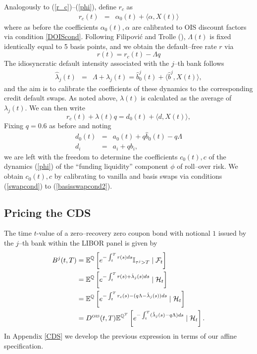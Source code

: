 \documentclass[12pt,a4paper]{article}
\theoremstyle{plain}
\numberwithin{equation}{section}
\begin{document}
Analogously to (\ref{r_c})--(\ref{phi}), define $r_c$ as
\begin{eqnarray}
r_c(t)    &=& \alpha_0(t)+\langle \alpha , X(t) \rangle\label{r}
\end{eqnarray}
where as before the coefficients $\alpha_0(t), \alpha$ are calibrated to OIS discount factors via condition \ref{DOIScond}. Following Filipovi\'c and Trolle (\citeyear*{FilTro:2013}), $\Lambda(t)$ is fixed identically equal to 5 basis points, and we obtain the default--free rate $r$ via
\begin{equation}
r(t)=r_c(t)-\Lambda q
\end{equation}
The idiosyncratic default intensity associated with the $j$--th bank follows
\begin{eqnarray}
\hat{\lambda}_j(t) &=&\Lambda+ \lambda_j(t) =\hat{b}_0^j(t)+\langle \hat{b}^j , X(t) \rangle,\label{lambdaj} \end{eqnarray}
and the aim is to calibrate the coefficients of these dynamics to the corresponding credit default swaps. As noted above, $\lambda(t)$ is calculated as the average of $ \lambda_j(t)$. We can then write
$$r_c(t)+\lambda(t)q=d_0(t)+\langle d, X(t) \rangle,$$
Fixing $q=0.6$ as before and noting
\begin{eqnarray}
d_0(t) &=& a_0(t)+q\hat b_0(t)-q\Lambda\\
d_i &=& a_i+qb_i,
\end{eqnarray}
we are left with the freedom to determine the coefficients $c_0(t), c$ of the dynamics (\ref{phi}) of the ``funding liquidity'' component $\phi$ of roll--over risk. We obtain $c_0(t), c$ by calibrating to vanilla and basis swaps via conditions (\ref{swapcond}) to (\ref{basisswapcond2}).

\subsection{Pricing the CDS}
The time $t$-value of a zero--recovery zero coupon bond with notional $1$ issued by the $j$--th bank within the LIBOR panel is given by
\begin{eqnarray}\label{unsecure}
\begin{aligned}
B^j(t,T)&=\mathbb{E}^\mathbb{Q}\left[ e^{-\int_t^{T} r(s) ds} \mathbb{I}_{\tau^j>T}\mid \mathcal{F}_t\right]\\
&=\mathbb{E}^\mathbb{Q}\left[ e^{-\int_t^{T}r(s)+\hat{\lambda}_j(s) ds}\mid \mathcal{H}_t \right]\\
&=\mathbb{E}^\mathbb{Q}\left[ e^{-\int_t^{T}r_c(s)-(q\Lambda-\hat{\lambda}_j(s)) ds}\mid \mathcal{H}_t \right]\\
&=D^{\tiny \mbox{OIS}}(t,T)\mathbb{E}^{\mathbb{Q}^T}\left[ e^{-\int_t^{T}(\hat{\lambda}_j(s)-q\Lambda) ds}\mid \mathcal{H}_t \right].
\end{aligned}
\end{eqnarray}
In Appendix \ref{CDS} we develop the previous expression in terms of our affine specification.
\end{document}
